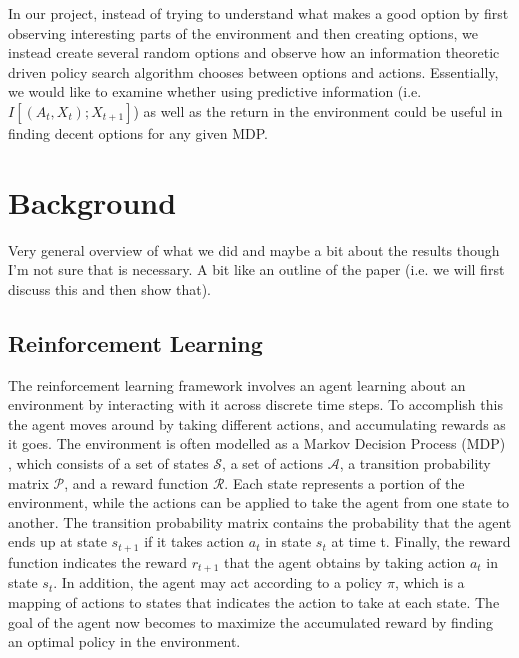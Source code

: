 \documentclass{acm_proc_article-sp}
\begin{document}
In our project, instead of trying to understand what makes a good option by first observing interesting parts of the environment and then creating options, we instead create several random options and observe how an information theoretic driven policy search algorithm \cite{still} chooses between options and actions. Essentially, we would like to examine whether using predictive information (i.e. $I[(A_t,X_t); X_{t+1}]$) as well as the return in the environment could be useful in finding decent options for any given MDP.

\section{Background} %

Very general overview of what we did and maybe a bit about the results though I'm not sure that is necessary. A bit like an outline of the paper (i.e. we will first discuss this and then show that).

\subsection{Reinforcement Learning}


The reinforcement learning framework involves an agent learning about an environment by interacting with it across discrete time steps. To accomplish this the agent moves around by taking different actions, and accumulating rewards as it goes.
	 The environment is often modelled as a Markov Decision Process (MDP) \cite{Puterman}, which consists of a set of states $\mathcal{S}$, a set of actions $\mathcal{A}$, a transition probability matrix $\mathcal{P}$, and a reward function $\mathcal{R}$. Each state represents a portion of the environment, while the actions can be applied to take the agent from one state to another. 
	 The transition probability matrix contains the probability that the agent ends up at state $s_{t+1}$ if it takes action $a_t$ in state $s_t$ at time t. Finally, the reward function indicates the reward $r_{t+1}$ that the agent obtains by taking action $a_t$ in state $s_t$. In addition, the agent may act according to a policy $\pi$, which is a mapping of actions to states that indicates the action to take at each state. The goal of the agent now becomes to maximize the accumulated reward by finding an optimal policy in the environment.  
	 
\end{document}
